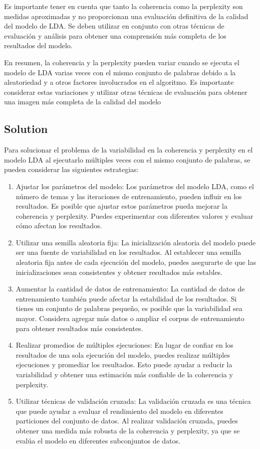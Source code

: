 \documentclass[10pt]{article} %
\begin{document}
	Es importante tener en cuenta que tanto la coherencia como la perplexity son medidas aproximadas y no proporcionan una evaluación definitiva de la calidad del modelo de LDA. Se deben utilizar en conjunto con otras técnicas de evaluación y análisis para obtener una comprensión más completa de los resultados del modelo.
	
	En resumen, la coherencia y la perplexity pueden variar cuando se ejecuta el modelo de LDA varias veces con el mismo conjunto de palabras debido a la aleatoriedad y a otros factores involucrados en el algoritmo. Es importante considerar estas variaciones y utilizar otras técnicas de evaluación para obtener una imagen más completa de la calidad del modelo
	
	\subsection{Solution}
	
	Para solucionar el problema de la variabilidad en la coherencia y perplexity en el modelo LDA al ejecutarlo múltiples veces con el mismo conjunto de palabras, se pueden considerar las siguientes estrategias:
	\begin{enumerate}
		\item Ajustar los parámetros del modelo: Los parámetros del modelo LDA, como el número de temas y las iteraciones de entrenamiento, pueden influir en los resultados. Es posible que ajustar estos parámetros pueda mejorar la coherencia y perplexity. Puedes experimentar con diferentes valores y evaluar cómo afectan los resultados.
		
		\item Utilizar una semilla aleatoria fija: La inicialización aleatoria del modelo puede ser una fuente de variabilidad en los resultados. Al establecer una semilla aleatoria fija antes de cada ejecución del modelo, puedes asegurarte de que las inicializaciones sean consistentes y obtener resultados más estables.
		
		\item 	Aumentar la cantidad de datos de entrenamiento: La cantidad de datos de entrenamiento también puede afectar la estabilidad de los resultados. Si tienes un conjunto de palabras pequeño, es posible que la variabilidad sea mayor. Considera agregar más datos o ampliar el corpus de entrenamiento para obtener resultados más consistentes.
		
		\item Realizar promedios de múltiples ejecuciones: En lugar de confiar en los resultados de una sola ejecución del modelo, puedes realizar múltiples ejecuciones y promediar los resultados. Esto puede ayudar a reducir la variabilidad y obtener una estimación más confiable de la coherencia y perplexity.
		
		\item Utilizar técnicas de validación cruzada: La validación cruzada es una técnica que puede ayudar a evaluar el rendimiento del modelo en diferentes particiones del conjunto de datos. Al realizar validación cruzada, puedes obtener una medida más robusta de la coherencia y perplexity, ya que se evalúa el modelo en diferentes subconjuntos de datos.
	\end{enumerate}
	
\end{document}
